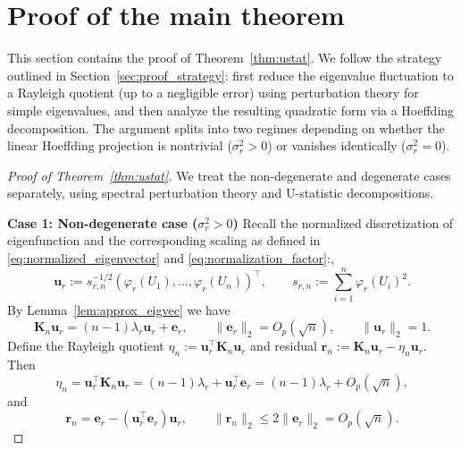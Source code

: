 \documentclass[11pt]{article}
\theoremstyle{plain}
\theoremstyle{remark}
\begin{document}
\section{Proof of the main theorem}
\label{sec:tech}
This section contains the proof of Theorem~\ref{thm:ustat}. We follow the strategy outlined in Section~\ref{sec:proof_strategy}: first reduce the eigenvalue fluctuation to a Rayleigh quotient (up to a negligible error) using perturbation theory for simple eigenvalues, and then analyze the resulting quadratic form via a Hoeffding decomposition. The argument splits into two regimes depending on whether the linear Hoeffding projection is nontrivial ($\sigma_r^2>0$) or vanishes identically ($\sigma_r^2=0$).

\begin{proof}[Proof of Theorem~\ref{thm:ustat}]
We treat the non-degenerate and degenerate cases separately, using spectral perturbation theory and U-statistic decompositions.

\textbf{Case 1: Non-degenerate case ($\sigma_r^2 > 0$)} Recall the normalized discretization of eigenfunction and the corresponding scaling as defined in \eqref{eq:normalized_eigenvector} and \eqref{eq:normalization_factor}:,  
\[
\mathbf{u}_r := s_{r,n}^{-1/2}(\varphi_r(U_1),\dots,\varphi_r(U_n))^\top, \qquad
s_{r,n} := \sum_{i=1}^n \varphi_r(U_i)^2.
\]
By Lemma~\ref{lem:approx_eigvec} we have 
\[
\mathbf{K}_n \mathbf{u}_r = (n-1)\lambda_r \mathbf{u}_r + \mathbf{e}_r,\qquad
\|\mathbf{e}_r\|_2 = O_p(\sqrt{n}),\qquad
\|\mathbf{u}_r\|_2=1.
\]
Define the Rayleigh quotient $\eta_n := \mathbf{u}_r^\top \mathbf{K}_n \mathbf{u}_r$ and residual
$\mathbf{r}_n := \mathbf{K}_n\mathbf{u}_r - \eta_n\mathbf{u}_r$. Then
\[
\eta_n
=
\mathbf{u}_r^\top \mathbf{K}_n \mathbf{u}_r
=
(n-1)\lambda_r + \mathbf{u}_r^\top \mathbf{e}_r
=
(n-1)\lambda_r + O_p(\sqrt n),
\]
and
\[
\mathbf{r}_n
=
\mathbf{e}_r - (\mathbf{u}_r^\top\mathbf{e}_r)\mathbf{u}_r,\qquad
\|\mathbf{r}_n\|_2 \le 2\|\mathbf{e}_r\|_2 = O_p(\sqrt n).
\]


\end{proof}
\end{document}

